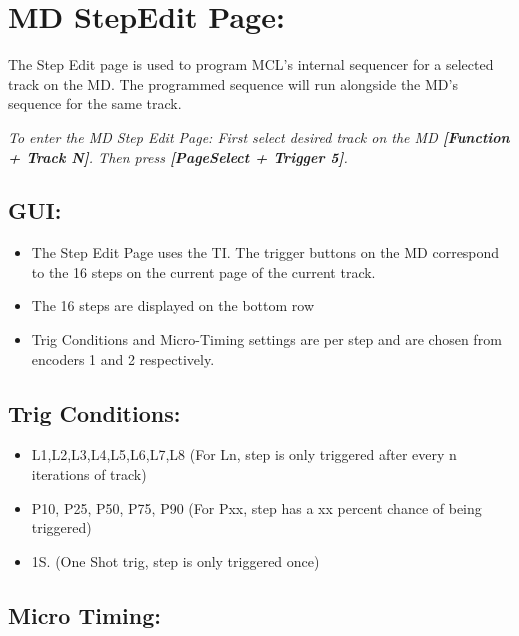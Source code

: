 \chapter{MD StepEdit Page:}

The Step Edit page is used to program MCL's internal sequencer for a selected track on the MD. The programmed sequence will run alongside the MD's sequence for the same track.


\textit{To enter the MD Step Edit Page: First select desired track on the MD \textbf{[Function + Track N]}. Then press \textbf{[PageSelect + Trigger 5]}.}



\section{GUI:}
\begin{itemize}
\item The Step Edit Page uses the TI. The trigger buttons on the MD correspond to the 16 steps on the current page of the current track.
\item The 16 steps are displayed on the bottom row
\item Trig Conditions and Micro-Timing settings are per step and are chosen from encoders 1 and 2 respectively.
\end{itemize}

\section{Trig Conditions:}
\begin{itemize}
\item L1,L2,L3,L4,L5,L6,L7,L8 (For Ln, step is only triggered after every n iterations of track)
\item P10, P25, P50, P75, P90 (For Pxx, step has a xx percent chance of being triggered)
\item 1S. (One Shot trig, step is only triggered once)
\end{itemize}
\section{Micro Timing:}

